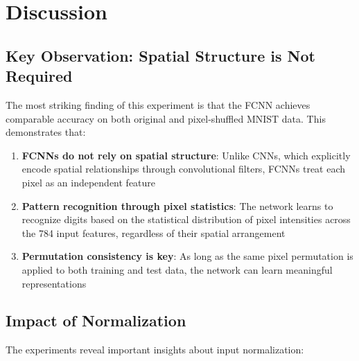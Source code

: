 \documentclass[11pt,a4paper]{article}
\begin{document}
\section{Discussion}

\subsection{Key Observation: Spatial Structure is Not Required}

The most striking finding of this experiment is that the FCNN achieves comparable accuracy on both original and pixel-shuffled MNIST data. This demonstrates that:

\begin{enumerate}
    \item \textbf{FCNNs do not rely on spatial structure}: Unlike CNNs, which explicitly encode spatial relationships through convolutional filters, FCNNs treat each pixel as an independent feature
    
    \item \textbf{Pattern recognition through pixel statistics}: The network learns to recognize digits based on the statistical distribution of pixel intensities across the 784 input features, regardless of their spatial arrangement
    
    \item \textbf{Permutation consistency is key}: As long as the same pixel permutation is applied to both training and test data, the network can learn meaningful representations
\end{enumerate}


\subsection{Impact of Normalization}

The experiments reveal important insights about input normalization:
\end{document}
